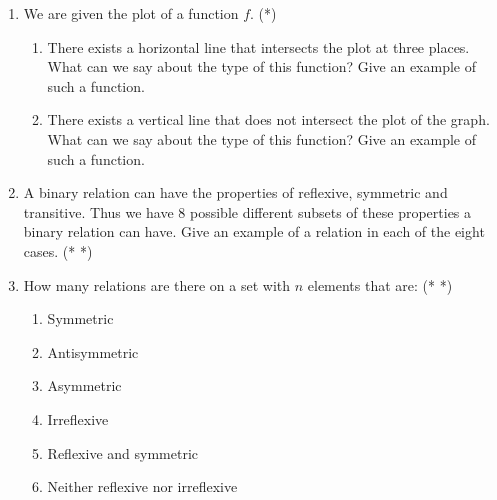 \documentclass[a4paper]{article}
\begin{document}
\begin{enumerate}
\item We are given the plot of a function $f$.  (*)
\begin{enumerate}
\item There exists a horizontal line that intersects the plot at three places. What can we say about the type of this function? Give an example of such a function.
\item There exists a vertical line that does not intersect the plot of the graph. What can we say about the type of this function? Give an example of such a function.
\end{enumerate}
\item A binary relation can have the properties of reflexive, symmetric and transitive. Thus we have 8 possible different subsets of these properties a binary relation can have. Give
an example of a relation in each of the eight cases. (* *)

\item How many relations are there on a set with $n$ elements that are: (* *)
\begin{enumerate}
\item Symmetric
\item Antisymmetric
\item Asymmetric
\item Irreflexive
\item Reflexive and symmetric
\item Neither reflexive nor irreflexive
\end{enumerate}




\end{enumerate}
\end{document}
